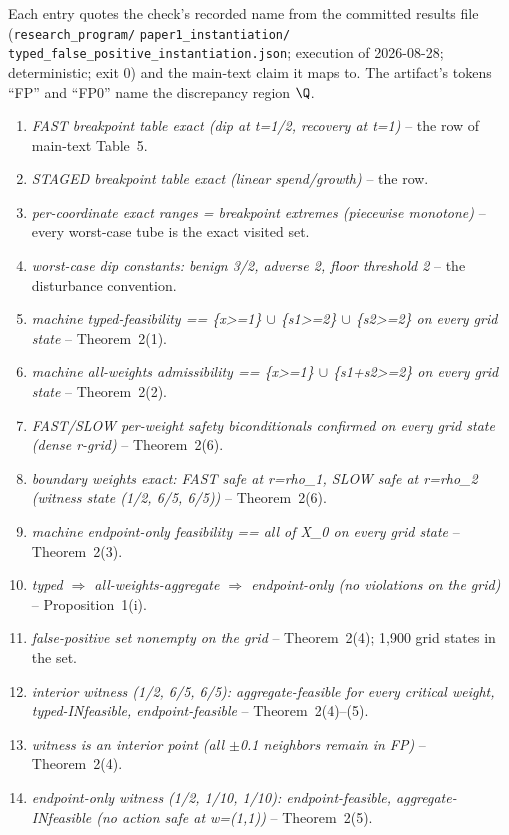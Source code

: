 Each entry quotes the check's recorded name from the committed results file (\texttt{research\_program/} \texttt{paper1\_instantiation/} \texttt{typed\_false\_positive\_instantiation.json}; execution of 2026-08-28; deterministic; exit 0) and the main-text claim it maps to. The artifact's tokens ``FP'' and ``FP0'' name the discrepancy region $\Q$.
\begin{enumerate}[leftmargin=2em,itemsep=1pt]
\item \emph{FAST breakpoint table exact (dip at t=1/2, recovery at t=1)} -- the  row of main-text Table~5.
\item \emph{STAGED breakpoint table exact (linear spend/growth)} -- the  row.
\item \emph{per-coordinate exact ranges = breakpoint extremes (piecewise monotone)} -- every worst-case tube is the exact visited set.
\item \emph{worst-case dip constants: benign 3/2, adverse 2, floor threshold 2} -- the disturbance convention.
\item \emph{machine typed-feasibility == \{x>=1\} $\cup$ \{s1>=2\} $\cup$ \{s2>=2\} on every grid state} -- Theorem~2(1).
\item \emph{machine all-weights admissibility == \{x>=1\} $\cup$ \{s1+s2>=2\} on every grid state} -- Theorem~2(2).
\item \emph{FAST/SLOW per-weight safety biconditionals confirmed on every grid state (dense r-grid)} -- Theorem~2(6).
\item \emph{boundary weights exact: FAST safe at r=rho\_1, SLOW safe at r=rho\_2 (witness state (1/2, 6/5, 6/5))} -- Theorem~2(6).
\item \emph{machine endpoint-only feasibility == all of X\_0 on every grid state} -- Theorem~2(3).
\item \emph{typed $\Rightarrow$ all-weights-aggregate $\Rightarrow$ endpoint-only (no violations on the grid)} -- Proposition~1(i).
\item \emph{false-positive set nonempty on the grid} -- Theorem~2(4); 1,900 grid states in the set.
\item \emph{interior witness (1/2, 6/5, 6/5): aggregate-feasible for every critical weight, typed-INfeasible, endpoint-feasible} -- Theorem~2(4)--(5).
\item \emph{witness is an interior point (all $\pm$0.1 neighbors remain in FP)} -- Theorem~2(4).
\item \emph{endpoint-only witness (1/2, 1/10, 1/10): endpoint-feasible, aggregate-INfeasible (no action safe at w=(1,1))} -- Theorem~2(5).

\end{enumerate}
